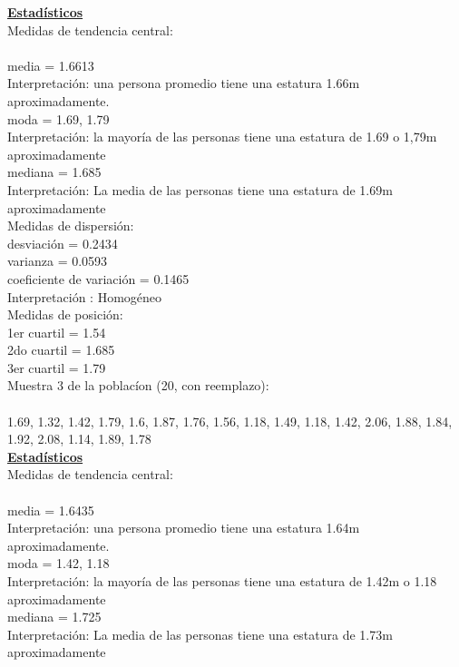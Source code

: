 \documentclass[a4paper,12pt]{article}
\begin{document}
\begin{enumerate}
\textbf{\underline{Estad\'isticos}} \\

Medidas de tendencia central:\\\\
media = 1.6613\\
Interpretaci\'on: una persona promedio tiene una estatura 1.66m aproximadamente.\\
moda = 1.69, 1.79\\
Interpretaci\'on: la mayor\'ia de las personas tiene una estatura de 1.69 o 1,79m aproximadamente\\
mediana = 1.685\\
Interpretaci\'on: La media de las personas tiene una estatura de 1.69m aproximadamente\\

Medidas de dispersi\'on:\\
desviaci\'on = 0.2434\\
varianza = 0.0593\\
coeficiente de variaci\'on = 0.1465\\
Interpretaci\'on : Homog\'eneo\\

Medidas de posici\'on:\\
1er cuartil = 1.54\\
2do cuartil = 1.685\\
3er cuartil = 1.79\\

\newpage
Muestra 3 de la poblac\'ion (20, con reemplazo): \\\\
1.69,	1.32,	1.42,	1.79,	1.6,    1.87,
1.76,	1.56,	1.18,	1.49,	1.18,	1.42,
2.06,	1.88,	1.84,	1.92,	2.08,	1.14,
1.89,	1.78\\

\textbf{\underline{Estad\'isticos}} \\

Medidas de tendencia central:\\\\
media =  1.6435\\
Interpretaci\'on: una persona promedio tiene una estatura 1.64m aproximadamente.\\
moda =  1.42, 1.18\\
Interpretaci\'on: la mayor\'ia de las personas tiene una estatura de 1.42m o 1.18 aproximadamente\\
mediana =  1.725\\
Interpretaci\'on: La media de las personas tiene una estatura de 1.73m aproximadamente\\


\end{enumerate}
\end{document}
